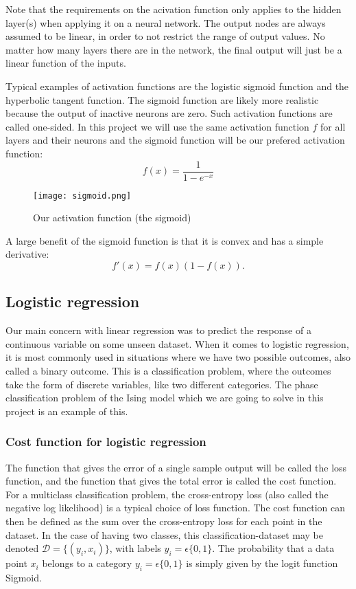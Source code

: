 \documentclass[a4paper,12pt]{article}
\begin{document}
Note that the requirements on the acivation function only applies to the hidden layer(s) when applying it on a neural network. The output nodes are always assumed to be linear, in order to not restrict the range of output values. No matter how many layers there are in the network, the final output will just be a linear function of the inputs.\newline

Typical examples of activation functions are the logistic sigmoid function and the hyperbolic tangent function. The sigmoid function are likely more realistic because the output of inactive neurons are zero. Such activation functions are called one-sided. In this project we will use the same activation function $f$ for all layers and their neurons and the sigmoid function will be our prefered activation function: 
\begin{equation}
    f(x) = \frac{1}{ 1 - e^{-x} }
\end{equation}

\begin{figure}[h!]
  \centering
  \caption{Our activation function (the sigmoid)}
  \texttt{[image: sigmoid.png]}
\end{figure}

A large benefit of the sigmoid function is that it is convex and has a simple derivative:
\begin{equation}
    f'(x) = f(x)(1-f(x)).
\end{equation}

\subsection{Logistic regression}
Our main concern with linear regression was to predict the response of a continuous variable on some unseen dataset. When it comes to logistic regression, it is most commonly used in situations where we have two possible outcomes, also called a binary outcome. This is a classification problem, where the outcomes take the form of discrete variables, like two different categories. The phase classification problem of the Ising model which we are going to solve in this project is an example of this.

\subsubsection{Cost function for logistic regression}
The function that gives the error of a single sample output will be called the loss function, and the function that gives the total error is called the cost function. For a multiclass classification problem, the cross-entropy loss (also called the negative log likelihood) is a typical choice of loss function. The cost function can then be defined as the sum over the cross-entropy loss for each point in the dataset. In the case of having two classes, this classification-dataset may be denoted {$\mathcal{D} = \{(y_i, x_i)\}$}, with labels $y_i = \epsilon \{0, 1\}$. The probability that a data point $x_i$ belongs to a category $y_i = \epsilon \{0, 1\}$ is simply given by the logit function Sigmoid.\newline
 
\end{document}
